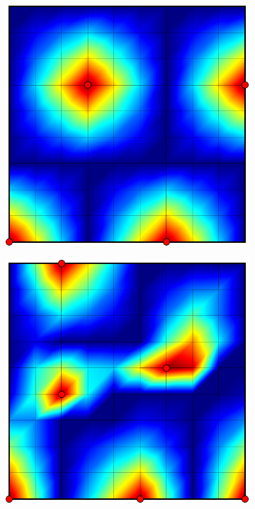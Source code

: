 \begin{figure}[htbp]
\begin{subfigure}[t]{0.3\textwidth}
  \end{subfigure}
  \par\bigskip
  \begin{subfigure}[t]{0.3\textwidth}
    \centerline{\includegraphics[width=0.9\linewidth]{figs/square/square_cart_struct_node_conv}}
  \end{subfigure}
  \hfill
  \begin{subfigure}[t]{0.3\textwidth}
    \centerline{\includegraphics[width=0.9\linewidth]{figs/square/square_cart_metis_node_conv}}

\end{subfigure}
\end{figure}
